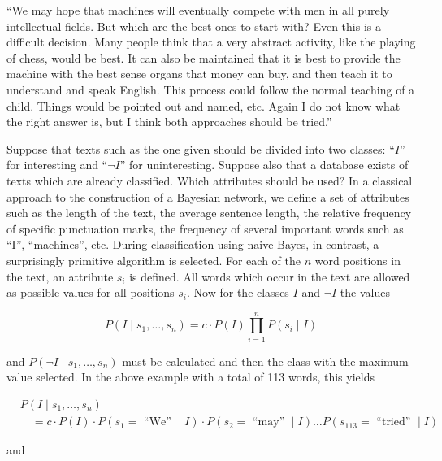 \documentclass[10pt]{book}
\begin{document}
\begin{displayquote}
``We may hope that machines will eventually compete with men in all purely intellectual fields. But which are the best ones to start with? Even this is a difficult decision. Many people think that a very abstract activity, like the playing of chess, would be best. It can also be maintained that it is best to provide the machine with the best sense organs that money can buy, and then teach it to understand and speak English. This process could follow the normal teaching of a child. Things would be pointed out and named, etc. Again I do not know what the right answer is, but I think both approaches should be tried.''
\end{displayquote}

Suppose that texts such as the one given should be divided into two classes: ``$I$'' for interesting and ``$\neg I$'' for uninteresting. Suppose also that a database exists of texts which are already classified. Which attributes should be used? In a classical approach to the construction of a Bayesian network, we define a set of attributes such as the length of the text, the average sentence length, the relative frequency of specific punctuation marks, the frequency of several important words such as ``I'', ``machines'', etc. During classification using naive Bayes, in contrast, a surprisingly primitive algorithm is selected. For each of the $n$ word positions in the text, an attribute $s_{i}$ is defined. All words which occur in the text are allowed as possible values for all positions $s_{i}$. Now for the classes $I$ and $\neg I$ the values

\begin{equation*}
P\left(I \mid s_{1}, \ldots, s_{n}\right)=c \cdot P(I) \prod_{i=1}^{n} P\left(s_{i} \mid I\right) \tag{8.9}
\end{equation*}

and $P\left(\neg I \mid s_{1}, \ldots, s_{n}\right)$ must be calculated and then the class with the maximum value selected. In the above example with a total of 113 words, this yields

$$
\begin{aligned}
& P\left(I \mid s_{1}, \ldots, s_{n}\right) \\
& \quad=c \cdot P(I) \cdot P\left(s_{1}=\text { ``We'' } \mid I\right) \cdot P\left(s_{2}=\text { ``may'' } \mid I\right) \ldots P\left(s_{113}=\text { ``tried'' } \mid I\right)
\end{aligned}
$$

and
\end{document}
